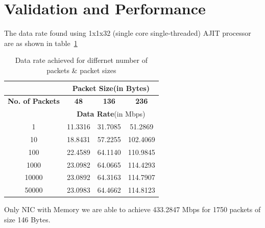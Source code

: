 \documentclass[12pt]{report}
\begin{document}
	\section{Validation and Performance}
		The data rate found using 1x1x32 (single core single-threaded) AJIT processor are as shown in table~\ref{table_dataRate}
		\begin{table}[htbp]
			\caption{Data rate achieved for differnet number of packets \& packet sizes}
			\begin{center}
				\begin{tabular}{|c|c|c|c|}
					\hline
					& \multicolumn{3}{c|}{\textbf{Packet Size}(in Bytes)}\\
					\hline
					\textbf{No. of Packets}& \textbf{48}			& \textbf{136}			& \textbf{236} 	  \\
					\hline
					&  \multicolumn{3}{c|}{\textbf{Data Rate}(in Mbps)}\\	
					\hline
					1			& 11.3316		  	& 31.7085			& 51.2869 \\
					\hline
					10			& 18.8431		  	& 57.2255			& 102.4069\\
					\hline
					100			& 22.4589		  	& 64.1140			& 110.9845\\
					\hline
					1000			& 23.0982			& 64.0665			& 114.4293\\
					\hline
					10000			& 23.0892			& 64.3163			& 114.7907\\
					\hline
					50000			& 23.0983			& 64.4662			& 114.8123\\
					\hline
				\end{tabular}
				\label{table_dataRate}
			\end{center}
		\end{table}
	
	Only NIC with Memory we are able to achieve 433.2847 Mbps for 1750 packets of size 146 Bytes.
\end{document}
